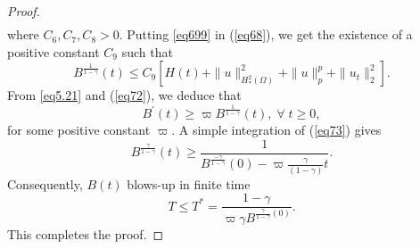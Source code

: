 \documentclass[10pt,a4paper]{amsart}
\begin{document}
\begin{proof}
\begin{eqnarray}
\end{eqnarray}
where $C_6, C_7, C_8>0$. Putting \eqref{eq699} in (\ref{eq68}), we get the existence of a positive constant $C_9$ such that
\begin{equation}\label{eq72}
B^{\frac{1}{1-\gamma}}(t) \leq C_9\left[H(t)+\|u\|_{H^2_*(\Omega)}^{2}+\|u\|_{p}^{p}+\|u_{t}\|_{2}^{2}\right].
\end{equation}
From \eqref{eq5.21} and (\ref{eq72}), we deduce that
\begin{equation}
B^{\prime}(t) \geq \varpi B^{\frac{1}{1-\gamma}}(t),\;\forall\;t\geq 0,
\label{eq73}
\end{equation}
for some positive constant $\varpi$.
A simple integration of (\ref{eq73}) gives
$$
B^{\frac{\gamma}{1-\gamma}}(t) \geq \frac{1}{B^{\frac{-\gamma}{1-\gamma}}(0)-\varpi \frac{\gamma}{(1-\gamma)} t}.
$$
Consequently, $B(t)$ blows-up in finite time
$$
T \leq T^{*}=\frac{1-\gamma}{\varpi \gamma B^{\frac{\gamma}{1-\gamma}(0)}}.
$$
This completes the proof.
\end{proof}
\end{document}
